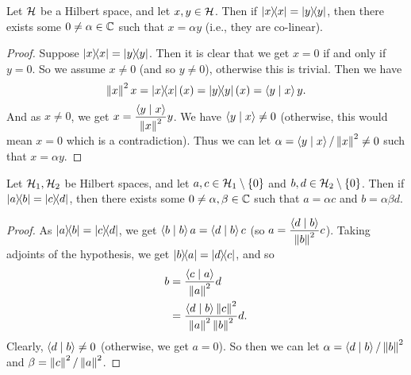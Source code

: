  \begin{proposition}\label{colinear_of_rankOne_self_eq_rankOne_self}\leanok
  Let $\Hcal$ be a Hilbert space, and let $x,y\in\Hcal$. Then if $\ketbra{x}{x}=\ketbra{y}{y}$, then there exists some $0\neq\alpha\in\CC$ such that $x=\alpha{y}$ (i.e., they are co-linear).
 \end{proposition}
 \begin{proof}\leanok
  Suppose $\ketbra{x}{x}=\ketbra{y}{y}$. Then it is clear that we get $x=0$ if and only if $y=0$. So we assume $x\neq0$ (and so $y\neq0$), otherwise this is trivial.
  Then we have \[\norm{x}^2x=\ketbra{x}{x}(x)=\ketbra{y}{y}(x)=\ip{y}{x}y.\]
  And as $x\neq0$, we get $x=\dfrac{\ip{y}{x}}{\norm{x}^2}y$. We have $\ip{y}{x}\neq0$ (otherwise, this would mean $x=0$ which is a contradiction). Thus we can let $\alpha=\ip{y}{x}/\norm{x}^2\neq0$ such that $x=\alpha{y}$.
 \end{proof}

 \begin{proposition}\label{colinear_of_rankOne_eq_rankOne}
    \leanok
  Let $\Hcal_1,\Hcal_2$ be Hilbert spaces, and let $a,c\in\Hcal_1\setminus\{0\}$ and $b,d\in\Hcal_2\setminus\{0\}$.
  Then if $\ketbra{a}{b}=\ketbra{c}{d}$, then there exists some $0\neq\alpha,\beta\in\CC$ such that
  $a = \alpha c$ and $b=\alpha\beta d$.
 \end{proposition}
 \begin{proof}\leanok
  As $\ketbra{a}{b}=\ketbra{c}{d}$, we get
  $\ip{b}{b}a = \ip{d}{b}c$ (so $a = \dfrac{\ip{d}{b}}{\norm{b}^2}c$).
  Taking adjoints of the hypothesis, we get $\ketbra{b}{a}=\ketbra{d}{c}$, and so
  \begin{align*}
   b &= \frac{\ip{c}{a}}{\norm{a}^2}d\\
   &= \frac{\ip{d}{b}\norm{c}^2}{\norm{a}^2\norm{b}^2}d.
  \end{align*}
  Clearly, $\ip{d}{b}\neq0$ (otherwise, we get $a=0$). So then we can let $\alpha=\ip{d}{b}/\norm{b}^2$ and $\beta=\norm{c}^2/\norm{a}^2$.
 \end{proof}


